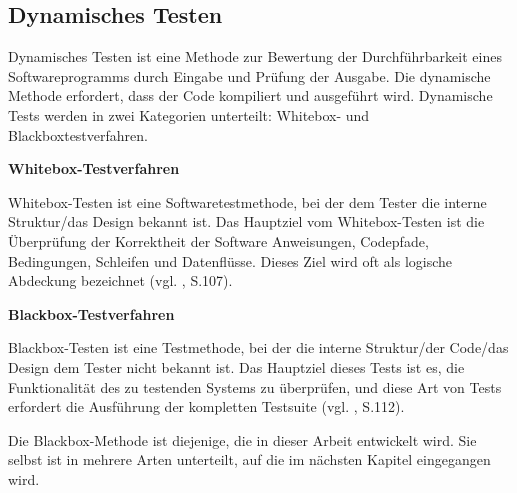 \subsection{Dynamisches Testen}

Dynamisches Testen ist eine Methode zur Bewertung
der Durchführbarkeit eines Softwareprogramms durch
Eingabe und Prüfung der Ausgabe. Die dynamische Methode
erfordert, dass der Code kompiliert und ausgeführt
wird. Dynamische Tests werden in zwei Kategorien unterteilt:
Whitebox- und  Blackboxtestverfahren.

\textbf{Whitebox-Testverfahren}

Whitebox-Testen ist eine Softwaretestmethode, bei
der dem Tester die interne Struktur/das Design
bekannt ist. Das Hauptziel  vom Whitebox-Testen ist
die Überprüfung der Korrektheit der Software
Anweisungen, Codepfade, Bedingungen, Schleifen
und Datenflüsse. Dieses Ziel wird oft als logische
Abdeckung bezeichnet (vgl. \cite{shultz2011software}, S.107).


\textbf{Blackbox-Testverfahren}

Blackbox-Testen ist eine Testmethode, bei der die
interne Struktur/der Code/das Design dem Tester nicht
bekannt ist. Das Hauptziel dieses Tests ist es, die
Funktionalität des zu testenden Systems zu überprüfen,
und diese Art von Tests erfordert die Ausführung der
kompletten Testsuite (vgl. \cite{shultz2011software}, S.112).


Die Blackbox-Methode ist diejenige, die in dieser
Arbeit entwickelt wird. Sie selbst ist in mehrere
Arten unterteilt, auf die im nächsten Kapitel
eingegangen wird.

